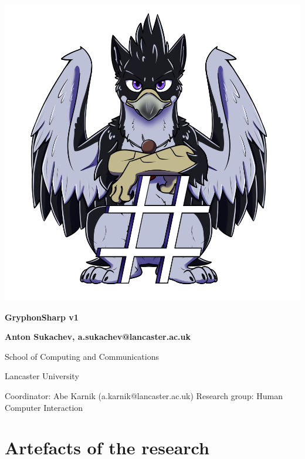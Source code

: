 \documentclass{article}
\begin{document}
\begin{titlepage}

    \center

    \includegraphics[scale=0.5]{AzuGryphonSharp.png} %

    \huge  \textbf{GryphonSharp v1}

    \vspace{2cm}

    \Large \textbf{Anton Sukachev, a.sukachev@lancaster.ac.uk}

    School of Computing and Communications

    Lancaster University

    \vfill

    Coordinator: Abe Karnik (a.karnik@lancaster.ac.uk)\endgraf
    Research group: Human Computer Interaction

\end{titlepage}
\pagebreak

\tableofcontents
\pagebreak



\section{Artefacts of the research}
\end{document}
